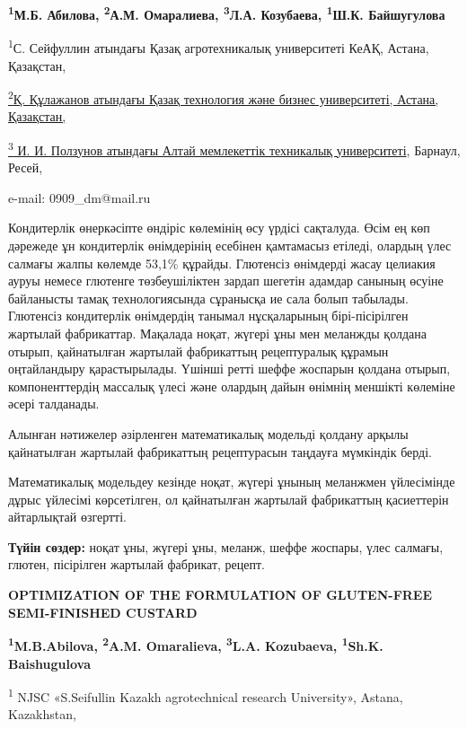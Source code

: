 {\bfseries \textsuperscript{1}М.Б. Абилова\textsuperscript{\envelope },
\textsuperscript{2}А.М. Омаралиева, \textsuperscript{3}Л.А. Козубаева,
\textsuperscript{1}Ш.К. Байшугулова}

\textsuperscript{1}С. Сейфуллин атындағы Қазақ агротехникалық
университеті КеАҚ, Астана, Қазақстан,

\href{https://bankchart.kz/spravochniki/pochtovyye_indeksy/id/116470}{\textsuperscript{2}Қ.
Құлажанов атындағы Қазақ технология және бизнес университеті, Астана,
Қазақстан,}

\href{https://bankchart.kz/spravochniki/pochtovyye_indeksy/id/116470}{\textsuperscript{3}
И. И. Ползунов атындағы Алтай мемлекеттік техникалық университеті},
Барнаул, Ресей,

e-mail: 0909\_dm@mail.ru

Кондитерлік өнеркәсіпте өндіріс көлемінің өсу үрдісі сақталуда. Өсім ең
көп дәрежеде ұн кондитерлік өнімдерінің есебінен қамтамасыз етіледі,
олардың үлес салмағы жалпы көлемде 53,1\% құрайды. Глютенсіз өнімдерді
жасау целиакия ауруы немесе глютенге төзбеушіліктен зардап шегетін
адамдар санының өсуіне байланысты тамақ технологиясында сұранысқа ие
сала болып табылады. Глютенсіз кондитерлік өнімдердің танымал
нұсқаларының бірі-пісірілген жартылай фабрикаттар. Мақалада ноқат,
жүгері ұны мен меланжды қолдана отырып, қайнатылған жартылай фабрикаттың
рецептуралық құрамын оңтайландыру қарастырылады. Үшінші ретті шеффе
жоспарын қолдана отырып, компоненттердің массалық үлесі және олардың
дайын өнімнің меншікті көлеміне әсері талданады.

Алынған нәтижелер әзірленген математикалық модельді қолдану арқылы
қайнатылған жартылай фабрикаттың рецептурасын таңдауға мүмкіндік берді.

Математикалық модельдеу кезінде ноқат, жүгері ұнының меланжмен
үйлесімінде дұрыс үйлесімі көрсетілген, ол қайнатылған жартылай
фабрикаттың қасиеттерін айтарлықтай өзгертті.

{\bfseries Түйін сөздер:} ноқат ұны, жүгері ұны, меланж, шеффе жоспары,
үлес салмағы, глютен, пісірілген жартылай фабрикат, рецепт.

{\bfseries OPTIMIZATION OF THE FORMULATION OF GLUTEN-FREE SEMI-FINISHED
CUSTARD}

{\bfseries \textsuperscript{1}M.B.Abilova\textsuperscript{\envelope },
\textsuperscript{2}A.M. Omaralieva, \textsuperscript{3}L.A. Kozubaeva,
\textsuperscript{1}Sh.K. Baishugulova}

\textsuperscript{1} NJSC «S.Seifullin Kazakh agrotechnical research
University», Astana, Kazakhstan,

